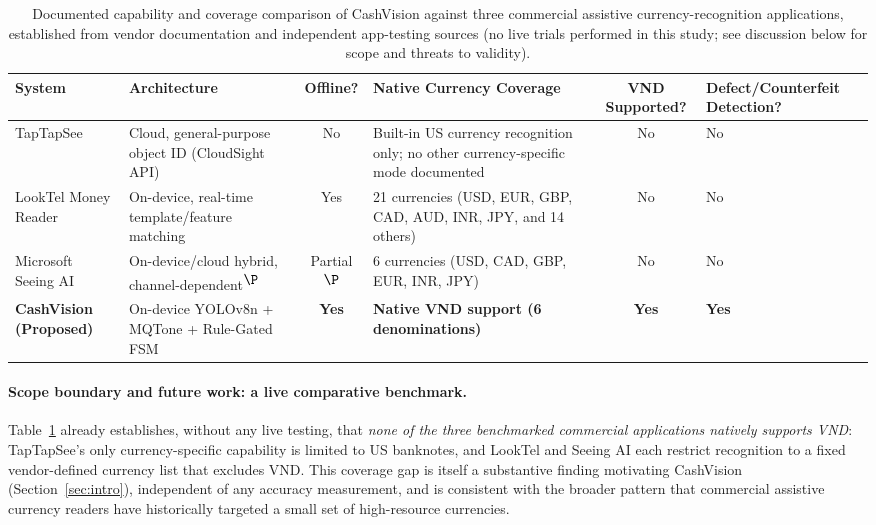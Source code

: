 \documentclass[final,5p,times,twocolumn,authoryear]{elsarticle}
\begin{document}
\begin{table}[t]
\centering
\caption{Documented capability and coverage comparison of CashVision against three commercial assistive currency-recognition applications, established from vendor documentation and independent app-testing sources (no live trials performed in this study; see discussion below for scope and threats to validity).}
\label{tab:sota_commercial}
\setlength{\tabcolsep}{2pt}
\scriptsize
\begin{tabular}{@{}p{3.2cm}p{3.5cm}c p{4.0cm}c p{4.0cm}@{}}
\toprule
\textbf{System} & \textbf{Architecture} & \textbf{Offline?} & \textbf{Native Currency Coverage} & \textbf{VND Supported?} & \textbf{Defect/Counterfeit Detection?} \\
\midrule
TapTapSee~\cite{TapTapSee} & Cloud, general-purpose object ID (CloudSight API) & No & Built-in US currency recognition only; no other currency-specific mode documented & No & No \\
LookTel Money Reader~\cite{LookTel} & On-device, real-time template/feature matching & Yes & 21 currencies (USD, EUR, GBP, CAD, AUD, INR, JPY, and 14 others) & No & No \\
Microsoft Seeing AI~\cite{SeeingAI} & On-device/cloud hybrid, channel-dependent\textsuperscript{$\P$} & Partial\textsuperscript{$\P$} & 6 currencies (USD, CAD, GBP, EUR, INR, JPY) & No & No \\
\midrule
\textbf{CashVision (Proposed)} & On-device YOLOv8n + MQTone + Rule-Gated FSM & \textbf{Yes} & \textbf{Native VND support (6 denominations)} & \textbf{Yes} & \textbf{Yes} \\
\bottomrule
\end{tabular}
\par\smallskip{}
\end{table}

\paragraph{Scope boundary and future work: a live comparative benchmark.}
Table~\ref{tab:sota_commercial} already establishes, without any live testing, that \emph{none of the three benchmarked commercial applications natively supports VND}: TapTapSee's only currency-specific capability is limited to US banknotes, and LookTel and Seeing AI each restrict recognition to a fixed vendor-defined currency list that excludes VND. This coverage gap is itself a substantive finding motivating CashVision (Section~\ref{sec:intro}), independent of any accuracy measurement, and is consistent with the broader pattern that commercial assistive currency readers have historically targeted a small set of high-resource currencies.
\end{document}
